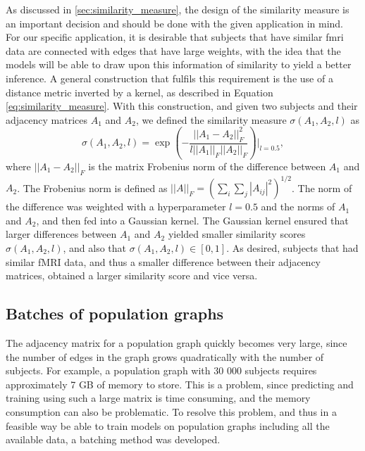 As discussed in \cref{sec:similarity_measure}, the design of the similarity measure is an important decision and should be done with the given application in mind. For our specific application, it is desirable that subjects that have similar \acrshort{fmri} data are connected with edges that have large weights, with the idea that the models will be able to draw upon this information of similarity to yield a better inference. A general construction that fulfils this requirement is the use of a distance metric inverted by a kernel, as described in Equation \eqref{eq:similarity_measure}. With this construction, and given two subjects and their adjacency matrices $A_1$ and $A_2$, we defined the similarity measure $\sigma\left(A_1, A_2, l\right)$ as
\begin{equation}
    \sigma\left(A_1, A_2, l\right) = \exp{\left(- \frac{||A_1 - A_2||_F^2}{l||A_1||_F ||A_2||_F} \right)}\biggr\rvert_{l=0.5},
    \label{eq:modified_similarity_measure}
\end{equation}
where $||A_1 - A_2 ||_F$ is the matrix Frobenius norm of the difference between $A_1$ and $A_2$. The Frobenius norm is defined as $||A||_F = \left( \sum_i \sum_j |A_{ij}|^2 \right)^{1/2}$. The norm of the difference was weighted with a hyperparameter $l=0.5$ and the norms of $A_1$ and $A_2$, and then fed into a Gaussian kernel. The Gaussian kernel ensured that larger differences between $A_1$ and $A_2$ yielded smaller similarity scores $\sigma\left(A_1, A_2, l\right)$, and also that  $\sigma\left(A_1, A_2, l\right) \in \left[0, 1\right]$. As desired, subjects that had similar fMRI data, and thus a smaller difference between their adjacency matrices, obtained a larger similarity score and vice versa. 


\subsection{Batches of population graphs}
The adjacency matrix for a population graph quickly becomes very large, since the number of edges in the graph grows quadratically with the number of subjects. For example, a population graph with 30 000 subjects requires approximately 7 GB of memory to store. This is a problem, since predicting and training using such a large matrix is time consuming, and the memory consumption can also be problematic. To resolve this problem, and thus in a feasible way be able to train models on population graphs including all the available data, a batching method was developed. 

